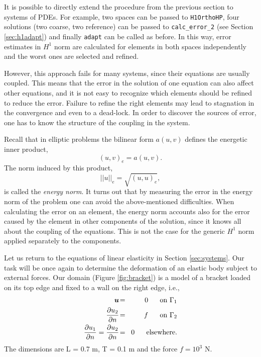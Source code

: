 It is possible to directly extend the procedure from the previous section to systems
of PDEs. For example, two spaces can be passed to {\tt H1OrthoHP}, four solutions (two coarse,
two reference) can be passed to \verb"calc_error_2" (see Section \ref{sec:h1adapt}) and finally
{\tt adapt} can be called as before. In this way, error estimates in $H^1$ norm are calculated
for elements in both spaces independently and the worst ones are selected and refined.

However, this approach fails for many systems, since their equations are usually coupled.
This means that the error in the solution of one equation can also affect other equations,
and it is not easy to recognize which elements should be refined to reduce the error.
Failure to refine the right elements may lead to stagnation in the convergence and even to a dead-lock.
In order to discover the sources of error, one has to know the structure of the coupling in the
system.

Recall that in elliptic problems the bilinear form $a(u,v)$ defines the energetic inner product,
$$(u,v)_e = a(u,v).$$
The norm induced by this product,
$$||u||_e = \sqrt{(u,u)_e},$$
is called the {\it energy norm}.  
It turns out that by measuring the error in the energy norm of the problem one can avoid the
above-mentioned difficulties. When calculating the error on an element, the energy norm accounts
also for the error caused by the element in other components of the solution, since it knows
all about the coupling of the equations. This is not the case for
the generic $H^1$ norm applied separately to the components.

Let us return to the equations of linear elasticity in Section \ref{sec:systems}. Our task 
will be once again to determine the deformation of an elastic body subject to external forces.
Our domain (Figure \ref{fig:bracket}) is a model of a bracket loaded on its top edge and fixed
to a wall on the right edge, i.e.,
\begin{eqnarray*}
  \mbox{\boldmath $u$} \!&=&\! 0 \ \ \ \ \ \rm{on}\ \Gamma_1  \\
  \frac{\partial u_2}{\partial n} \!&=&\! f \ \ \ \ \ \rm{on}\ \Gamma_2 \\
  \frac{\partial u_1}{\partial n} = \frac{\partial u_2}{\partial n} \!&=&\! 0 \ \ \ \ \ \rm{elsewhere.} 
\end{eqnarray*}
The dimensions are L = 0.7 m, T = 0.1 m and the force $f = 10^3$ N.

